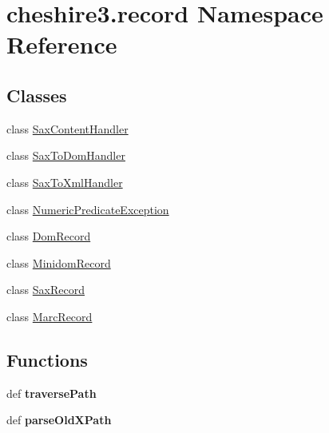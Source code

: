 \hypertarget{namespacecheshire3_1_1record}{\section{cheshire3.\-record Namespace Reference}
\label{namespacecheshire3_1_1record}
}
\subsection*{Classes}
\begin{DoxyCompactItemize}
\item 
class \hyperlink{classcheshire3_1_1record_1_1_sax_content_handler}{Sax\-Content\-Handler}
\item 
class \hyperlink{classcheshire3_1_1record_1_1_sax_to_dom_handler}{Sax\-To\-Dom\-Handler}
\item 
class \hyperlink{classcheshire3_1_1record_1_1_sax_to_xml_handler}{Sax\-To\-Xml\-Handler}
\item 
class \hyperlink{classcheshire3_1_1record_1_1_numeric_predicate_exception}{Numeric\-Predicate\-Exception}
\item 
class \hyperlink{classcheshire3_1_1record_1_1_dom_record}{Dom\-Record}
\item 
class \hyperlink{classcheshire3_1_1record_1_1_minidom_record}{Minidom\-Record}
\item 
class \hyperlink{classcheshire3_1_1record_1_1_sax_record}{Sax\-Record}
\item 
class \hyperlink{classcheshire3_1_1record_1_1_marc_record}{Marc\-Record}
\end{DoxyCompactItemize}
\subsection*{Functions}
\begin{DoxyCompactItemize}
\item 
\hypertarget{namespacecheshire3_1_1record_a2841788df7588af9442800a9bda31f63}{def {\bfseries traverse\-Path}}\label{namespacecheshire3_1_1record_a2841788df7588af9442800a9bda31f63}

\item 
\hypertarget{namespacecheshire3_1_1record_a347d31f076fbaba341ab7652ee6f5ef0}{def {\bfseries parse\-Old\-X\-Path}}\label{namespacecheshire3_1_1record_a347d31f076fbaba341ab7652ee6f5ef0}

\end{DoxyCompactItemize}
